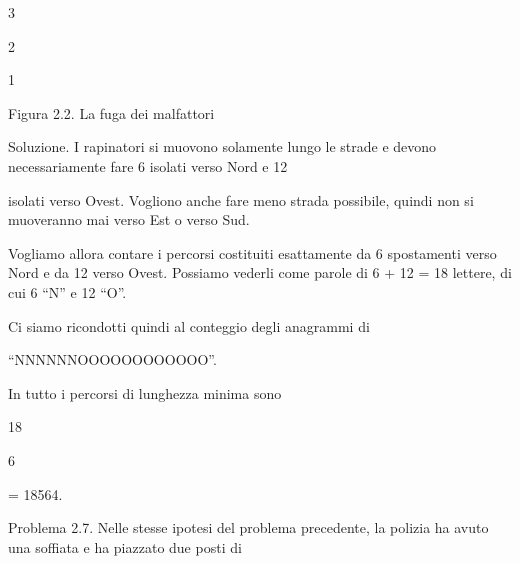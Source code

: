 \documentclass[a4paper,portrait,12pt]{article}
\begin{document}
3





2





1





\begin{flushleft}
Figura 2.2. La fuga dei malfattori
\end{flushleft}


\begin{flushleft}
Soluzione. I rapinatori si muovono solamente lungo le strade e devono necessariamente fare 6 isolati verso Nord e 12
\end{flushleft}


\begin{flushleft}
isolati verso Ovest. Vogliono anche fare meno strada possibile, quindi non si muoveranno mai verso Est o verso Sud.
\end{flushleft}


\begin{flushleft}
Vogliamo allora contare i percorsi costituiti esattamente da 6 spostamenti verso Nord e da 12 verso Ovest. Possiamo vederli come parole di 6 + 12 = 18 lettere, di cui 6 {``}N'' e 12 {``}O''.
\end{flushleft}


\begin{flushleft}
Ci siamo ricondotti quindi al conteggio degli anagrammi di
\end{flushleft}


\begin{flushleft}
``NNNNNNOOOOOOOOOOOO''.
\end{flushleft}


\begin{flushleft}
In tutto i percorsi di lunghezza minima sono
\end{flushleft}





18


6





= 18564.





\begin{flushleft}
Problema 2.7. Nelle stesse ipotesi del problema precedente, la polizia ha avuto una soffiata e ha piazzato due posti di
\end{flushleft}
\end{document}

